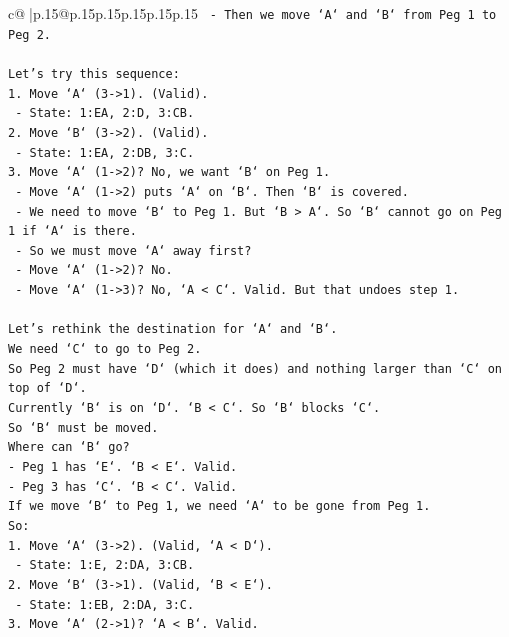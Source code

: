 \documentclass{article}
\begin{document}
{\begin{supertabular}{c@{$\;$}|p{.15\linewidth}@{}p{.15\linewidth}p{.15\linewidth}p{.15\linewidth}p{.15\linewidth}p{.15\linewidth}}
{{{\texttt{  {-} Then we move `A` and `B` from Peg 1 to Peg 2.} \\
\\ 
\texttt{Let's try this sequence:} \\
\texttt{1. Move `A` (3{-}>1). (Valid).} \\
\texttt{   {-} State: 1:EA, 2:D, 3:CB.} \\
\texttt{2. Move `B` (3{-}>2). (Valid).} \\
\texttt{   {-} State: 1:EA, 2:DB, 3:C.} \\
\texttt{3. Move `A` (1{-}>2)? No, we want `B` on Peg 1.} \\
\texttt{   {-} Move `A` (1{-}>2) puts `A` on `B`. Then `B` is covered.} \\
\texttt{   {-} We need to move `B` to Peg 1. But `B > A`. So `B` cannot go on Peg 1 if `A` is there.} \\
\texttt{   {-} So we must move `A` away first?} \\
\texttt{   {-} Move `A` (1{-}>2)? No.} \\
\texttt{   {-} Move `A` (1{-}>3)? No, `A < C`. Valid. But that undoes step 1.} \\
\\ 
\texttt{Let's rethink the destination for `A` and `B`.} \\
\texttt{We need `C` to go to Peg 2.} \\
\texttt{So Peg 2 must have `D` (which it does) and nothing larger than `C` on top of `D`.} \\
\texttt{Currently `B` is on `D`. `B < C`. So `B` blocks `C`.} \\
\texttt{So `B` must be moved.} \\
\texttt{Where can `B` go?} \\
\texttt{{-} Peg 1 has `E`. `B < E`. Valid.} \\
\texttt{{-} Peg 3 has `C`. `B < C`. Valid.} \\
\texttt{If we move `B` to Peg 1, we need `A` to be gone from Peg 1.} \\
\texttt{So:} \\
\texttt{1. Move `A` (3{-}>2). (Valid, `A < D`).} \\
\texttt{   {-} State: 1:E, 2:DA, 3:CB.} \\
\texttt{2. Move `B` (3{-}>1). (Valid, `B < E`).} \\
\texttt{   {-} State: 1:EB, 2:DA, 3:C.} \\
\texttt{3. Move `A` (2{-}>1)? `A < B`. Valid.} \\
}}}
\end{supertabular}}
\end{document}
